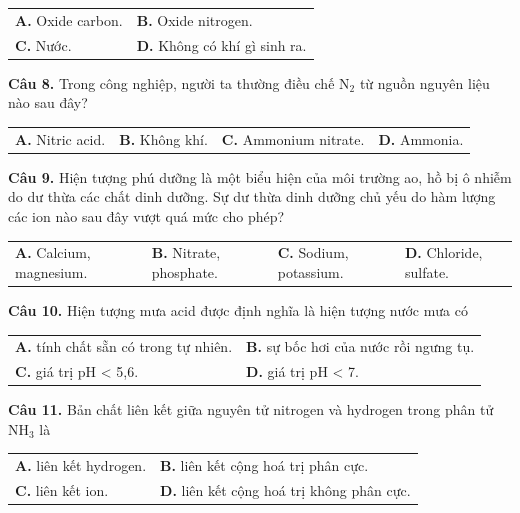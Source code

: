 \documentclass[13pt,a4paper]{article}
\begin{document}
\begin{tabularx}{\textwidth}{@{}XX@{}}
\textbf{A.} Oxide carbon. & \textbf{B.} Oxide nitrogen. \\
\textbf{C.} Nước. & \textbf{D.} Không có khí gì sinh ra. \\
\end{tabularx}

\vspace{1.6cm}

\textbf{Câu 8.} Trong công nghiệp, người ta thường điều chế N$_{2}$ từ nguồn nguyên liệu nào sau đây?

\begin{tabularx}{\textwidth}{@{}XXXX@{}}
\textbf{A.} Nitric acid. & \textbf{B.} Không khí. & \textbf{C.} Ammonium nitrate. & \textbf{D.} Ammonia. \\
\end{tabularx}

\vspace{1.6cm}

\textbf{Câu 9.} Hiện tượng phú dưỡng là một biểu hiện của môi trường ao, hồ bị ô nhiễm do dư thừa các chất dinh dưỡng. Sự dư thừa dinh dưỡng chủ yếu do hàm lượng các ion nào sau đây vượt quá mức cho phép?

\begin{tabularx}{\textwidth}{@{}XXXX@{}}
\textbf{A.} Calcium, magnesium. & \textbf{B.} Nitrate, phosphate. & \textbf{C.} Sodium, potassium. & \textbf{D.} Chloride, sulfate. \\
\end{tabularx}

\vspace{1.6cm}

\textbf{Câu 10.} Hiện tượng mưa acid được định nghĩa là hiện tượng nước mưa có

\begin{tabularx}{\textwidth}{@{}XX@{}}
\textbf{A.} tính chất sẵn có trong tự nhiên. & \textbf{B.} sự bốc hơi của nước rồi ngưng tụ. \\
\textbf{C.} giá trị pH < 5,6. & \textbf{D.} giá trị pH < 7. \\
\end{tabularx}

\vspace{1.6cm}

\textbf{Câu 11.} Bản chất liên kết giữa nguyên tử nitrogen và hydrogen trong phân tử NH$_{3}$ là

\begin{tabularx}{\textwidth}{@{}XX@{}}
\textbf{A.} liên kết hydrogen. & \textbf{B.} liên kết cộng hoá trị phân cực. \\
\textbf{C.} liên kết ion. & \textbf{D.} liên kết cộng hoá trị không phân cực. \\
\end{tabularx}
\end{document}
